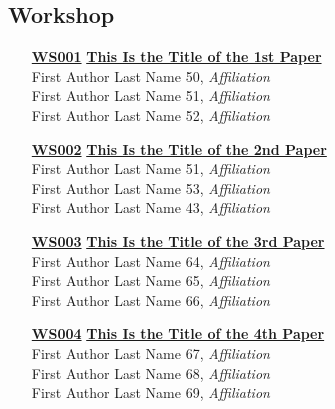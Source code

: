 \subsection{Workshop}
\begin{enumerate}
\item[\href{https://doi.org/10.1145/1111111.1111132}{\textbf{WS001}}]
\href{https://doi.org/10.1145/1111111.1111132}{\textbf{This Is the Title of the 1st Paper}}\\
First Author Last Name 50, \emph{Affiliation}\\
First Author Last Name 51, \emph{Affiliation}\\
First Author Last Name 52, \emph{Affiliation}\\

\item[\href{https://doi.org/10.1145/1111111.1111133}{\textbf{WS002}}]
\href{https://doi.org/10.1145/1111111.1111133}{\textbf{This Is the Title of the 2nd Paper}}\\
First Author Last Name 51, \emph{Affiliation}\\
First Author Last Name 53, \emph{Affiliation}\\
First Author Last Name 43, \emph{Affiliation}\\

\item[\href{https://doi.org/10.1145/1111111.1111134}{\textbf{WS003}}]
\href{https://doi.org/10.1145/1111111.1111134}{\textbf{This Is the Title of the 3rd Paper}}\\
First Author Last Name 64, \emph{Affiliation}\\
First Author Last Name 65, \emph{Affiliation}\\
First Author Last Name 66, \emph{Affiliation}\\

\item[\href{https://doi.org/10.1145/1111111.1111135}{\textbf{WS004}}]
\href{https://doi.org/10.1145/1111111.1111135}{\textbf{This Is the Title of the 4th Paper}}\\
First Author Last Name 67, \emph{Affiliation}\\
First Author Last Name 68, \emph{Affiliation}\\
First Author Last Name 69, \emph{Affiliation}\\
\end{enumerate}

